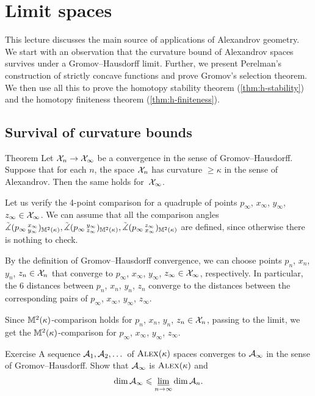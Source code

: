 \chapter{Limit spaces}\label{chap:lim}\label{chap:stability}

This lecture discusses the main source of applications of Alexandrov geometry.
We start with an observation that the curvature bound of Alexandrov spaces survives under a Gromov--Hausdorff limit.
Further, we present Perelman's construction of strictly concave functions and prove Gromov's selection theorem.
We then use all this to prove the homotopy stability theorem (\ref{thm:h-stability}) and the homotopy finiteness theorem (\ref{thm:h-finiteness}).

\section{Survival of curvature bounds}

\begin{thm}{Theorem}\label{thm:CBB-closed}
Let $\spc{X}_n\z\to \spc{X}_\infty$ be a convergence in the sense of Gromov--Hausdorff.
Suppose that for each $n$, the space $\mathcal{X}_n$ has curvature $\ge\kappa$ in the sense of Alexandrov.
Then the same holds for~$\mathcal{X}_\infty$.
\end{thm}

Let us verify the 4-point comparison for a quadruple of points $p_\infty$, $x_\infty$, $y_\infty$, $z_\infty\in \mathcal{X}_\infty$.
We can assume that all the comparison angles $\tilde\measuredangle(p_\infty\,{}^{x_\infty}_{y_\infty})_{\mathbb{M}^2(\kappa)}, \tilde\measuredangle(p_\infty\,{}^{y_\infty}_{z_\infty})_{\mathbb{M}^2(\kappa)}, \tilde\measuredangle(p_\infty\,{}^{z_\infty}_{x_\infty})_{\mathbb{M}^2(\kappa)}$ are defined, since otherwise there is nothing to check.

By the definition of Gromov--Hausdorff convergence, we can choose points $p_n$, $x_n$, $y_n$, $z_n\in \mathcal{X}_n$ that converge to $p_\infty$, $x_\infty$, $y_\infty$, $z_\infty\in \mathcal{X}_\infty$, respectively.
In particular, the 6 distances between $p_n$, $x_n$, $y_n$, $z_n$ converge to the distances between the corresponding pairs of $p_\infty$, $x_\infty$, $y_\infty$, $z_\infty$.

Since $\mathbb{M}^2(\kappa)$-comparison holds for $p_n$, $x_n$, $y_n$, $z_n\z\in \spc{X}_n$,
passing to the limit, we get the $\mathbb{M}^2(\kappa)$-comparison for $p_\infty$, $x_\infty$, $y_\infty$, $z_\infty$.
\qeds

\begin{thm}[!]{Exercise}\label{ex:dim-lim}
A sequence $\mathcal{A}_1,\mathcal{A}_2,\dots$ of $\textup{\textsc{Alex}}(\kappa)$ spaces converges to $\mathcal{A}_\infty$ in the sense of Gromov--Hausdorff.
Show that $\mathcal{A}_\infty$ is $\textup{\textsc{Alex}}(\kappa)$ and
\[\operatorname{\rm dim}\nolimits \mathcal{A}_\infty\leqslant \varliminf_{n\to\infty} \operatorname{\rm dim}\nolimits \mathcal{A}_n.\]
\end{thm}

